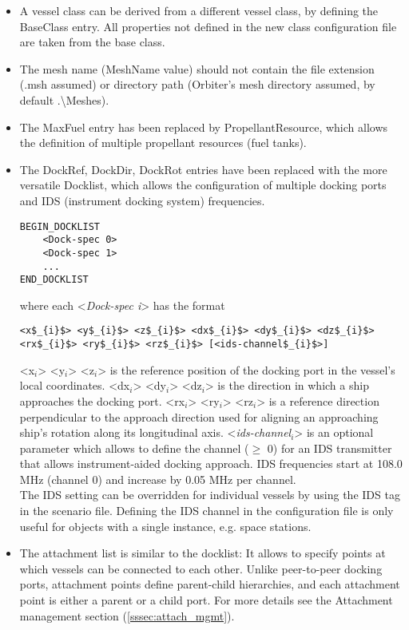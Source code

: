 \documentclass[Orbiter Developer Manual.tex]{subfiles}
\begin{document}
\begin{itemize}
\item A vessel class can be derived from a different vessel class, by defining the BaseClass entry. All properties not defined in the new class configuration file are taken from the base class.
\item The mesh name (MeshName value) should not contain the file extension (.msh assumed) or directory path (Orbiter's mesh directory assumed, by default .\textbackslash Meshes).
\item The MaxFuel entry has been replaced by PropellantResource, which allows the definition of multiple propellant resources (fuel tanks).
\item The DockRef, DockDir, DockRot entries have been replaced with the more versatile Docklist, which allows the configuration of multiple docking ports and IDS (instrument docking system) frequencies.

\begin{lstlisting}[language=OSFS]
BEGIN_DOCKLIST
	<Dock-spec 0>
	<Dock-spec 1>
	...
END_DOCKLIST
\end{lstlisting}

\noindent
where each <\textit{Dock-spec i}> has the format

\begin{lstlisting}[language=OSFS,mathescape=true]
<x$_{i}$> <y$_{i}$> <z$_{i}$> <dx$_{i}$> <dy$_{i}$> <dz$_{i}$> <rx$_{i}$> <ry$_{i}$> <rz$_{i}$> [<ids-channel$_{i}$>]
\end{lstlisting}

\noindent
<x$_{i}$> <y$_{i}$> <z$_{i}$> is the reference position of the docking port in the vessel's local coordinates. <dx$_{i}$> <dy$_{i}$> <dz$_{i}$> is the direction in which a ship approaches the docking port. <rx$_{i}$> <ry$_{i}$> <rz$_{i}$> is a reference direction perpendicular to the approach direction used for aligning an approaching ship's rotation along its longitudinal axis. <\textit{ids-channel}$_{i}$> is an optional parameter which allows to define the channel ($\geq$ 0) for an IDS transmitter that allows instrument-aided docking approach. IDS frequencies start at 108.0 MHz (channel 0) and increase by 0.05 MHz per channel.\\
The IDS setting can be overridden for individual vessels by using the IDS tag in the scenario file. Defining the IDS channel in the configuration file is only useful for objects with a single instance, e.g. space stations.

\item The attachment list is similar to the docklist: It allows to specify points at which vessels can be connected to each other. Unlike peer-to-peer docking ports, attachment points define parent-child hierarchies, and each attachment point is either a parent or a child port. For more details see the Attachment management section (\ref{sssec:attach_mgmt}).


\end{itemize}
\end{document}
